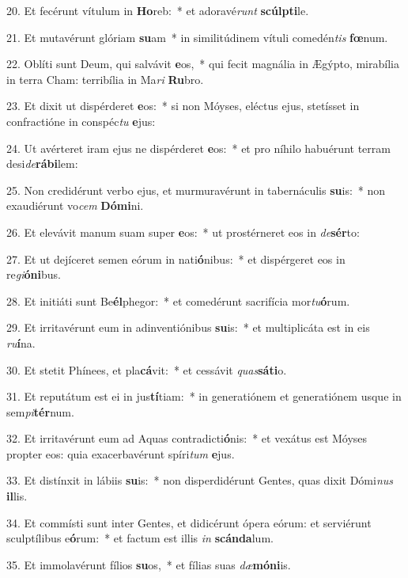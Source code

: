 20. Et fecérunt vítulum in \textbf{Ho}reb:~*  et adoravé\textit{runt} \textbf{scúlp}\textbf{ti}le.\

21. Et mutavérunt glóriam \textbf{su}am~*  in similitúdinem vítuli comedén\textit{tis} \textbf{fœ}num.\

22. Oblíti sunt Deum, qui salvávit \textbf{e}os,~*  qui fecit magnália in Ægýpto, mirabília in terra Cham: terribília in Ma\textit{ri} \textbf{Ru}bro.\

23. Et dixit ut dispérderet \textbf{e}os:~*  si non Móyses, eléctus ejus, stetísset in confractióne in conspéc\textit{tu} \textbf{e}jus:\

24. Ut avérteret iram ejus ne dispérderet \textbf{e}os:~*  et pro níhilo habuérunt terram desi\textit{de}\textbf{rá}\textbf{bi}lem:\

25. Non credidérunt verbo ejus, et murmuravérunt in tabernáculis \textbf{su}is:~*  non exaudiérunt vo\textit{cem} \textbf{Dó}\textbf{mi}ni.\

26. Et elevávit manum suam super \textbf{e}os:~*  ut prostérneret eos in \textit{de}\textbf{sér}to:\

27. Et ut dejíceret semen eórum in nati\textbf{ó}nibus:~*  et dispérgeret eos in re\textit{gi}\textbf{ó}\textbf{ni}bus.\

28. Et initiáti sunt Be\textbf{él}phegor:~*  et comedérunt sacrifícia mor\textit{tu}\textbf{ó}rum.\

29. Et irritavérunt eum in adinventiónibus \textbf{su}is:~*  et multiplicáta est in eis \textit{ru}\textbf{í}na.\

30. Et stetit Phínees, et pla\textbf{cá}vit:~*  et cessávit \textit{quas}\textbf{sá}\textbf{ti}o.\

31. Et reputátum est ei in jus\textbf{tí}tiam:~*  in generatiónem et generatiónem usque in sem\textit{pi}\textbf{tér}num.\

32. Et irritavérunt eum ad Aquas contradicti\textbf{ó}nis:~*  et vexátus est Móyses propter eos: quia exacerbavérunt spíri\textit{tum} \textbf{e}jus.\

33. Et distínxit in lábiis \textbf{su}is:~*  non disperdidérunt Gentes, quas dixit Dómi\textit{nus} \textbf{il}lis.\

34. Et commísti sunt inter Gentes, et didicérunt ópera eórum: et serviérunt sculptílibus e\textbf{ó}rum:~*  et factum est illis \textit{in} \textbf{scán}\textbf{da}lum.\

35. Et immolavérunt fílios \textbf{su}os,~*  et fílias suas \textit{dæ}\textbf{mó}\textbf{ni}is.\


